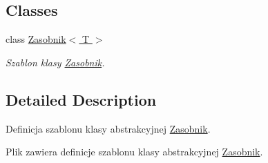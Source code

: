 \subsection*{Classes}
\begin{DoxyCompactItemize}
\item 
class \hyperlink{a00017}{Zasobnik$<$ T $>$}
\begin{DoxyCompactList}\small\item\em Szablon klasy \hyperlink{a00017}{Zasobnik}. \end{DoxyCompactList}\end{DoxyCompactItemize}


\subsection{Detailed Description}
Definicja szablonu klasy abstrakcyjnej \hyperlink{a00017}{Zasobnik}. 

Plik zawiera definicje szablonu klasy abstrakcyjnej \hyperlink{a00017}{Zasobnik}. 